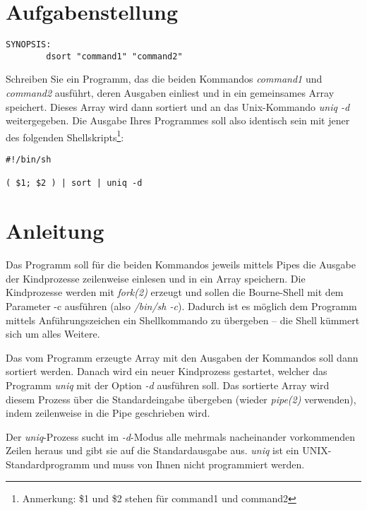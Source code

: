 




\section*{Aufgabenstellung}


\begin{verbatim}
SYNOPSIS:
        dsort "command1" "command2"
\end{verbatim}

Schreiben Sie ein Programm, das die beiden Kommandos \emph{command1}
und \emph{command2} ausführt, deren Ausgaben einliest und in ein
gemeinsames Array speichert. Dieses Array wird dann sortiert und an
das Unix-Kommando \emph{uniq -d} weitergegeben. Die Ausgabe Ihres
Programmes soll also identisch sein mit jener des folgenden
Shellskripts\footnote{Anmerkung: \$1 und \$2 stehen für command1 und
command2}:

\begin{verbatim}
#!/bin/sh

( $1; $2 ) | sort | uniq -d
\end{verbatim}

\section*{Anleitung}

Das Programm soll für die beiden Kommandos jeweils mittels Pipes die
Ausgabe der Kindprozesse zeilenweise einlesen und in ein Array
speichern. Die Kindprozesse werden mit \emph{fork(2)} erzeugt und
sollen die Bourne-Shell mit dem Parameter -c ausführen (also
\emph{/bin/sh -c}). Dadurch ist es möglich dem Programm mittels
Anführungszeichen ein Shellkommando zu übergeben – die Shell kümmert
sich um alles Weitere.

Das vom Programm erzeugte Array mit den Ausgaben der Kommandos soll
dann sortiert werden. Danach wird ein neuer Kindprozess gestartet,
welcher das Programm \emph{uniq} mit der Option \emph{-d} ausführen
soll. Das sortierte Array wird diesem Prozess über die Standardeingabe
übergeben (wieder \emph{pipe(2)} verwenden), indem zeilenweise in die
Pipe geschrieben wird.

Der \emph{uniq}-Prozess sucht im \emph{-d}-Modus alle mehrmals
nacheinander vorkommenden Zeilen heraus und gibt sie auf die
Standardausgabe aus. \emph{uniq} ist ein UNIX-Standardprogramm und
muss von Ihnen nicht programmiert werden.

